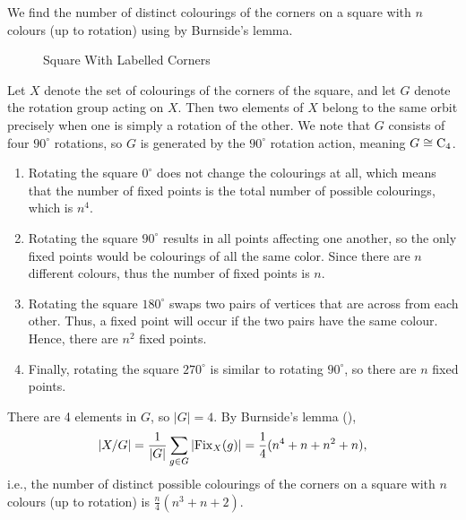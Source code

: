 \begin{example}
    We find the number of distinct colourings of the corners on a square with $n$ colours (up to rotation) using by Burnside's lemma.

    \begin{figure}[h]
	    \centering
	    \caption{Square With Labelled Corners}
	\end{figure}

    Let $X$ denote the set of colourings of the corners of the square, and let $G$ denote the rotation group acting on $X$. Then two elements of $X$ belong to the same orbit precisely when one is simply a rotation of the other. We note that $G$ consists of four $90^\circ$ rotations, so $G$ is generated by the $90^\circ$ rotation action, meaning $G \cong \mathrm{C}_{4}$.
    \begin{enumerate}
        \item Rotating the square $0^\circ$ does not change the colourings at all, which means that the number of fixed points is the total number of possible colourings, which is $n^4$.
        \item Rotating the square $90^\circ$ results in all points affecting one another, so the only fixed points would be colourings of all the same color. Since there are $n$ different colours, thus the number of fixed points is $n$.
        \item Rotating the square $180^\circ$ swaps two pairs of vertices that are across from each other. Thus, a fixed point will occur if the two pairs have the same colour. Hence, there are $n^2$ fixed points.
        \item Finally, rotating the square $270^\circ$ is similar to rotating $90^\circ$, so there are $n$ fixed points.
    \end{enumerate}
    There are 4 elements in $G$, so $|G| = 4$. By Burnside's lemma (),
    \[
        |X/G| = \frac{1}{|G|}\sum_{g\in G} |\mathrm{Fix}_{X}(g)| = \frac14 (n^4 + n + n^2 + n),
    \]
    i.e., the number of distinct possible colourings of the corners on a square with $n$ colours (up to rotation) is $\frac n4 (n^3 + n + 2)$.
\end{example}

